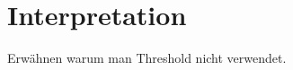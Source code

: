 \section{Interpretation}
\label{chp:study:sec:interpretation}
Erwähnen warum man Threshold nicht verwendet.
